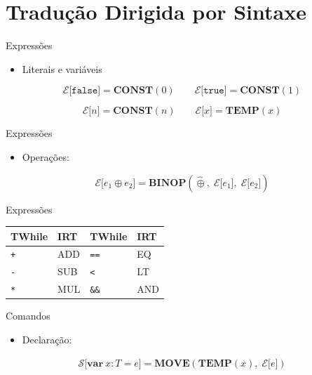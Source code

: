 \section{Tradução Dirigida por
Sintaxe}\label{traduuxe7uxe3o-dirigida-por-sintaxe}

\begin{frame}{Expressões}

    \begin{itemize}

        \item
        Literais e variáveis
    \end{itemize}

    \[\mathcal{E}\lbrack \mathtt{false} \rbrack = \mathbf{CONST}(0) \qquad \mathcal{E}\lbrack \mathtt{true} \rbrack = \mathbf{CONST}(1)\]

    \[\mathcal{E}\lbrack n \rbrack = \mathbf{CONST}(n) \qquad \mathcal{E}\lbrack x \rbrack = \mathbf{TEMP}(x)\]
\end{frame}

\begin{frame}{Expressões}

    \begin{itemize}

        \item
        Operações:
    \end{itemize}

    \[\mathcal{E}\lbrack e_1 \oplus e_2 \rbrack = \mathbf{BINOP}(\widehat{\oplus},\; \mathcal{E}\lbrack e_1 \rbrack,\; \mathcal{E}\lbrack e_2 \rbrack)\]
\end{frame}

\begin{frame}[fragile]{Expressões}

    \begin{table}
        \begin{tabular}{l l l l}
            \hline
            TWhile & IRT & TWhile & IRT \\
            \hline
            \texttt{+} & ADD & \texttt{==} & EQ \\
            \texttt{-} & SUB & \texttt{<} & LT \\
            \texttt{*} & MUL & \texttt{\&\&} &
            AND \\
            \hline
        \end{tabular}
    \end{table}
\end{frame}

\begin{frame}{Comandos}

    \begin{itemize}

        \item
        Declaração:
    \end{itemize}

    \[\begin{array}{c}
    \mathcal{S}\lbrack \mathbf{var}\ x : T = e \rbrack = \mathbf{MOVE}(\mathbf{TEMP}(x),\; \mathcal{E}\lbrack e \rbrack)
\end{array}\]
\end{frame}

